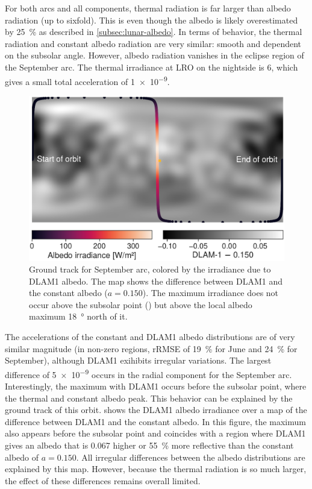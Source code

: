 For both arcs and all components, thermal radiation is far larger than albedo radiation (up to sixfold). This is even though the albedo is likely overestimated by \qty{25}{\percent} as described in \cref{subsec:lunar-albedo}. In terms of behavior, the thermal radiation and constant albedo radiation are very similar: smooth and dependent on the subsolar angle. However, albedo radiation vanishes in the eclipse region of the September arc. The thermal irradiance at \gls{LRO} on the nightside is \qty{6}{\irr}, which gives a small total acceleration of \qty{1e-9}{\acc}.


\begin{figure}[t]
    \centering
    \includegraphics[width=\linewidth]{figures/plots/groundtrack.pdf}
    \caption{Ground track for September arc, colored by the irradiance due to \gls{DLAM1} albedo. The map shows the difference between \gls{DLAM1} and the constant albedo ($a=0.150$). The maximum irradiance does not occur above the subsolar point (\textcolor{mpl-yellow}{}) but above the local albedo maximum \qty{18}{\degree} north of it.}
    \label{fig:groundtrack}
\end{figure}

The accelerations of the constant and \gls{DLAM1} albedo distributions are of very similar magnitude (in non-zero regions, rRMSE of \qty{19}{\percent} for June and \qty{24}{\percent} for September), although \gls{DLAM1} exihibits irregular variations. The largest difference of \qty{5e-9}{\acc} occurs in the radial component for the September arc. Interestingly, the maximum with \gls{DLAM1} occurs before the subsolar point, where the thermal and constant albedo peak. This behavior can be explained by the ground track of this orbit.  shows the \gls{DLAM1} albedo irradiance over a map of the difference between \gls{DLAM1} and the constant albedo. In this figure, the maximum also appears before the subsolar point and coincides with a region where \gls{DLAM1} gives an albedo that is \num{0.067} higher or \qty{55}{\percent} more reflective than the constant albedo of $a=0.150$. All irregular differences between the albedo distributions are explained by this map. However, because the thermal radiation is so much larger, the effect of these differences remains overall limited.








